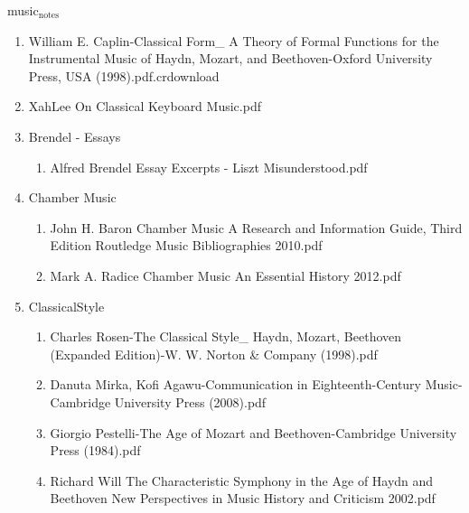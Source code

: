 \documentclass[11pt]{article}
\begin{document}
\item music$_{\text{notes}}$
\label{sec-1-1-1-1-31}
\begin{enumerate}
\item William E. Caplin-Classical Form\_ A Theory of Formal Functions for the Instrumental Music of Haydn, Mozart, and Beethoven-Oxford University Press, USA (1998).pdf.crdownload
\label{sec-1-1-1-1-31-1}

\item XahLee On Classical Keyboard Music.pdf
\label{sec-1-1-1-1-31-2}

\item Brendel - Essays
\label{sec-1-1-1-1-31-3}
\begin{enumerate}
\item Alfred Brendel Essay Excerpts - Liszt Misunderstood.pdf
\label{sec-1-1-1-1-31-3-1}
\end{enumerate}

\item Chamber Music
\label{sec-1-1-1-1-31-4}
\begin{enumerate}
\item John H. Baron Chamber Music A Research and Information Guide, Third Edition Routledge Music Bibliographies  2010.pdf
\label{sec-1-1-1-1-31-4-1}

\item Mark A. Radice Chamber Music An Essential History  2012.pdf
\label{sec-1-1-1-1-31-4-2}
\end{enumerate}

\item ClassicalStyle
\label{sec-1-1-1-1-31-5}
\begin{enumerate}
\item Charles Rosen-The Classical Style\_ Haydn, Mozart, Beethoven (Expanded Edition)-W. W. Norton \& Company (1998).pdf
\label{sec-1-1-1-1-31-5-1}

\item Danuta Mirka, Kofi Agawu-Communication in Eighteenth-Century Music-Cambridge University Press (2008).pdf
\label{sec-1-1-1-1-31-5-2}

\item Giorgio Pestelli-The Age of Mozart and Beethoven-Cambridge University Press (1984).pdf
\label{sec-1-1-1-1-31-5-3}

\item Richard Will The Characteristic Symphony in the Age of Haydn and Beethoven New Perspectives in Music History and Criticism  2002.pdf
\label{sec-1-1-1-1-31-5-4}
\end{enumerate}


\end{enumerate}
\end{document}
